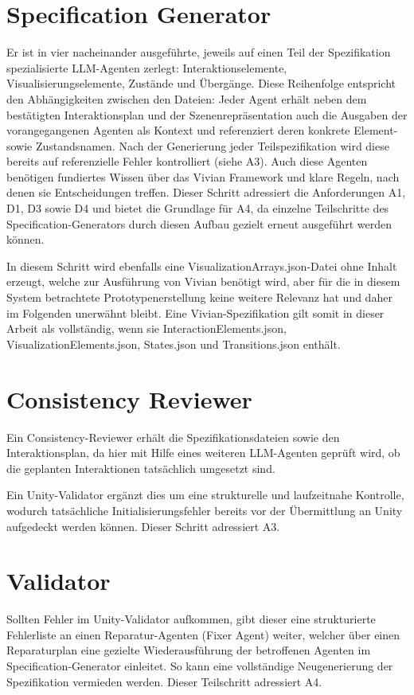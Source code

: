 \section{Specification Generator}
Er ist in vier nacheinander ausgeführte, jeweils auf einen Teil der Spezifikation spezialisierte LLM-Agenten zerlegt: Interaktionselemente, Visualisierungselemente, Zustände und Übergänge. Diese Reihenfolge entspricht den Abhängigkeiten zwischen den Dateien: Jeder Agent erhält neben dem bestätigten Interaktionsplan und der Szenenrepräsentation auch die Ausgaben der vorangegangenen Agenten als Kontext und referenziert deren konkrete Element- sowie Zustandsnamen.
Nach der Generierung jeder Teilspezifikation wird diese bereits auf referenzielle Fehler kontrolliert (siehe A3). Auch diese Agenten benötigen fundiertes Wissen über das Vivian Framework und klare Regeln, nach denen sie Entscheidungen treffen. Dieser Schritt adressiert die Anforderungen A1, D1, D3 sowie D4 und bietet die Grundlage für A4, da einzelne Teilschritte des Specification-Generators durch diesen Aufbau gezielt erneut ausgeführt werden können.

In diesem Schritt wird ebenfalls eine VisualizationArrays.json-Datei ohne Inhalt erzeugt, welche zur Ausführung von Vivian benötigt wird, aber für die in diesem System betrachtete Prototypenerstellung keine weitere Relevanz hat und daher im Folgenden unerwähnt bleibt.
Eine Vivian-Spezifikation gilt somit in dieser Arbeit als vollständig, wenn sie InteractionElements.json, VisualizationElements.json, States.json und Transitions.json enthält.

\section{Consistency Reviewer}
Ein Consistency-Reviewer erhält die Spezifikationsdateien sowie den Interaktionsplan, da hier mit Hilfe eines weiteren LLM-Agenten geprüft wird, ob die geplanten Interaktionen tatsächlich umgesetzt sind.

Ein Unity-Validator ergänzt dies um eine strukturelle und laufzeitnahe Kontrolle, wodurch tatsächliche Initialisierungsfehler bereits vor der Übermittlung an Unity aufgedeckt werden können. Dieser Schritt adressiert A3.

\section{Validator}

Sollten Fehler im Unity-Validator aufkommen, gibt dieser eine strukturierte Fehlerliste an einen Reparatur-Agenten (Fixer Agent) weiter, welcher über einen Reparaturplan eine gezielte Wiederausführung der betroffenen Agenten im Specification-Generator einleitet. So kann eine vollständige Neugenerierung der Spezifikation vermieden werden. Dieser Teilschritt adressiert A4.